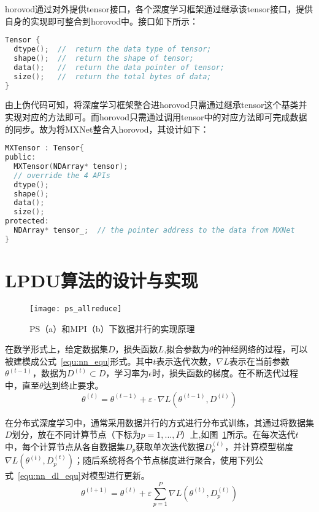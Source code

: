 horovod通过对外提供tensor接口，各个深度学习框架通过继承该tensor接口，提供自身的实现即可整合到horovod中。接口如下所示：

\begin{lstlisting}[language=C, numbers=none]
Tensor {
  dtype();  //  return the data type of tensor;
  shape();  //  return the shape of tensor;
  data();   //  return the data pointer of tensor;
  size();   //  return the total bytes of data;
}
\end{lstlisting}

由上伪代码可知，将深度学习框架整合进horovod只需通过继承tensor这个基类并实现对应的方法即可。而horovod只需通过调用tensor中的对应方法即可完成数据的同步。故为将MXNet整合入horovod，其设计如下：

\begin{lstlisting}[language=C, numbers=none]
MXTensor : Tensor{
public:
  MXTensor(NDArray* tensor);
  // override the 4 APIs
  dtype();
  shape();
  data();
  size();
protected:
  NDArray* tensor_;  // the pointer address to the data from MXNet
}
\end{lstlisting}

\section{LPDU算法的设计与实现}
\begin{figure}[htp]
\centering
\texttt{[image: ps\_allreduce]}
\caption{PS（a）和MPI（b）下数据并行的实现原理}
\label{fig:ps_allreduce}
\end{figure}

在数学形式上，给定数据集$D$，损失函数$L$,拟合参数为$\theta$的神经网络的过程，可以被建模成公式~\ref{equ:nn_equ}形式。其中$t$表示迭代次数，$\nabla L$表示在当前参数$\theta^{(t-1)}$，数据为$D^{(t)}\subset D$，学习率为$\epsilon$时，损失函数的梯度。在不断迭代过程中，直至$\theta$达到终止要求。
\begin{equation}
\label{equ:nn_equ}
\theta^{(t)}=\theta^{(t-1)}+\varepsilon\cdot\nabla L(\theta^{(t-1)},D^{(t)})
\end{equation}

在分布式深度学习中，通常采用数据并行的方式进行分布式训练，其通过将数据集$D$划分，放在不同计算节点（下标为$p=1,...,P$）上,如图~\ref{fig:ps_allreduce}所示。在每次迭代$t$中，每个计算节点从各自数据集$D_{p}$获取单次迭代数据$D^{(t)}_{p}$，并计算模型梯度$\nabla L(\theta^{(t)},D^{(t)}_{p})$；随后系统将各个节点梯度进行聚合，使用下列公式~\ref{equ:nn_dl_equ}对模型进行更新。
\begin{equation}
\label{equ:nn_dl_equ}
\theta^{(t+1)}=\theta^{(t)}+\varepsilon\sum^{P}_{p=1}\nabla L(\theta^{(t)},D^{(t)}_{p})
\end{equation}

